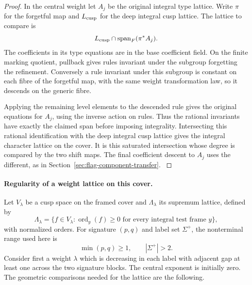 \begin{proof}
In the central weight let \(A_j\) be the original integral
type lattice. Write \(\pi\) for the forgetful map and \(L_{\rm cusp}\) for the deep integral cusp lattice. The lattice to compare is
\[
 L_{\rm cusp}\cap\operatorname{span}_F(\pi^* A_j).
\]
The coefficients in its type equations
are in the base coefficient field. On the finite marking quotient, pullback gives rules
invariant under the subgroup forgetting the refinement.
Conversely a rule invariant under this subgroup is constant
on each fibre of the forgetful map, with the same weight
transformation law, so it descends on the generic fibre.

Applying the remaining level elements to the descended
rule gives the original equations for \(A_j\), using the
inverse action on rules. Thus the rational invariants have
exactly the claimed span before imposing integrality. Intersecting this rational
identification with the deep integral cusp lattice gives
the integral character lattice on the cover. It is this
saturated intersection whose degree is compared by the
two shift maps. The final coefficient descent to \(A_j\)
uses the different, as in Section~\ref{sec:flag-component-transfer}.
\label{cor:deep-cover-on-core-7}

\end{proof}

\paragraph{Regularity of a weight lattice on this cover.}
Let \(V_\lambda\) be a cusp space on the framed cover
and \(\Lambda_\lambda\) its supremum lattice, defined by
\[
 \Lambda_\lambda=\{f\in V_\lambda:\operatorname{ord}_y(f)\ge0\text{ for every integral test frame }y\},
\]
with normalized orders. For signature \((p,q)\) and label set \(\Sigma^+\), the nonterminal range used here is
\[
 \min(p,q)\ge1,\qquad |\Sigma^+|>2.
\]
Consider first a weight \(\lambda\) which is decreasing
in each label with adjacent gap at least one across the two
signature blocks. The central exponent is initially zero.
The geometric comparisons needed for the lattice are the
following.



